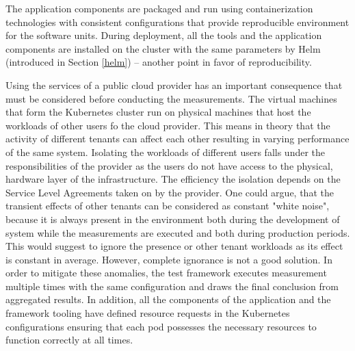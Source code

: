 The application components are packaged and run using containerization technologies with consistent configurations that provide reproducible environment for the software units. During deployment, all the tools and the application components are installed on the cluster with the same parameters by Helm (introduced in Section \ref{helm}) -- another point in favor of reproducibility.

Using the services of a public cloud provider has an important consequence that must be considered before conducting the measurements. The virtual machines that form the Kubernetes cluster run on physical machines that host the workloads of other users fo the cloud provider. This means in theory that the activity of different tenants can affect each other resulting in varying performance of the same system. Isolating the workloads of different users falls under the responsibilities of the provider as the users do not have access to the physical, hardware layer of the infrastructure. The efficiency the isolation depends on the Service Level Agreements taken on by the provider. One could argue, that the transient effects of other tenants can be considered as constant "white noise", because it is always present in the environment both during the development of system while the measurements are executed and both during production periods. This would suggest to ignore the presence or other tenant workloads as its effect is constant in average. However, complete ignorance is not a good solution. In order to mitigate these anomalies, the test framework executes measurement multiple times with the same configuration and draws the final conclusion from aggregated results. In addition, all the components of the application and the framework tooling have defined resource requests \cite{KubernetesResourceManagement} in the Kubernetes configurations ensuring that each pod possesses the necessary resources to function correctly at all times.

%
%

